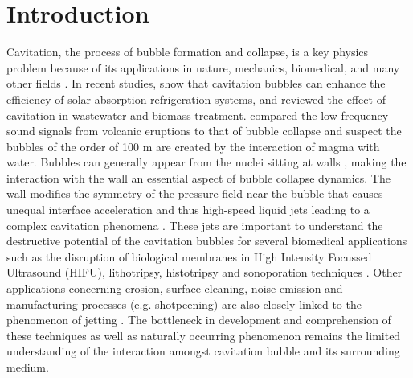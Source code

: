 \documentclass[final]{jfm}
\begin{document}
\section{Introduction}
\label{sec:intro}
Cavitation, the process of bubble formation and collapse, is a key physics problem because of its applications in nature, mechanics, biomedical, and many other fields \citep{cole1948,lohse2001,ohl2006,ohl2006sonoporation,maxwell2013,fuster2019review}.  In recent studies, \citet{hou2021study} show that cavitation bubbles can enhance the efficiency of solar absorption refrigeration systems, \citet{bhat2021cavitation} and \citet{prado2022review} reviewed the effect of cavitation in wastewater and biomass treatment. \citet{lyons2019infrasound} compared the low frequency sound signals from volcanic eruptions to that of bubble collapse and suspect the bubbles of the order of 100 m are created by the interaction of magma with water.
Bubbles can generally appear from the nuclei sitting at walls \citep{crum1979tensile,atchley1989crevice,borkent2009nucleation}, 
making the interaction with the wall an essential aspect of bubble collapse dynamics.
The wall modifies the symmetry of the pressure field near the bubble that causes unequal interface acceleration and thus high-speed liquid jets leading to a complex cavitation phenomena \citep{popinet2002bubble, brenner2002single,supponen2017collapse}. These jets are important to understand the destructive potential of the cavitation bubbles for several biomedical applications such as the disruption of biological membranes in High Intensity Focussed Ultrasound (HIFU), lithotripsy, histotripsy  and sonoporation techniques \citep{prentice2005membrane,ohl2006sonoporation,maxwell2011cavitation,pishchalnikov2019high}. Other applications concerning erosion, surface cleaning, noise emission and manufacturing processes (e.g. shotpeening) are also closely linked to the phenomenon of jetting \citep{krefting2004high,blake2015}.  The bottleneck in development and comprehension of these techniques as well as naturally occurring phenomenon remains the limited understanding of the interaction amongst cavitation bubble and its surrounding medium. \\
\end{document}
